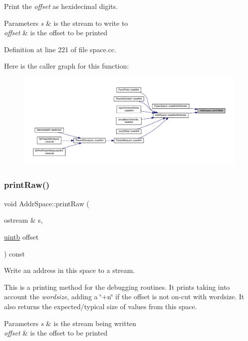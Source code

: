 Print the {\itshape offset} as hexidecimal digits. 
\begin{DoxyParams}{Parameters}
{\em s} & is the stream to write to \\
\hline
{\em offset} & is the offset to be printed \\
\hline
\end{DoxyParams}


Definition at line 221 of file space.\+cc.

Here is the caller graph for this function\+:
\nopagebreak
\begin{figure}[H]
\begin{center}
\leavevmode
\includegraphics[width=350pt]{class_addr_space_aac551de6286f9260153c1d7d1bacdab8_icgraph}
\end{center}
\end{figure}
\mbox{\label{class_addr_space_a76819b70cd6b6ae8601ac1821f86b929}} 
\subsubsection{\texorpdfstring{printRaw()}{printRaw()}}
{\footnotesize\ttfamily void Addr\+Space\+::print\+Raw (\begin{DoxyParamCaption}\item[{ostream \&}]{s,  }\item[{\mbox{\hyperlink{types_8h_a2db313c5d32a12b01d26ac9b3bca178f}{uintb}}}]{offset }\end{DoxyParamCaption}) const\hspace{0.3cm}{\ttfamily [virtual]}}



Write an address in this space to a stream. 

This is a printing method for the debugging routines. It prints taking into account the {\itshape wordsize}, adding a \char`\"{}+n\char`\"{} if the offset is not on-\/cut with wordsize. It also returns the expected/typical size of values from this space. 
\begin{DoxyParams}{Parameters}
{\em s} & is the stream being written \\
\hline
{\em offset} & is the offset to be printed \\
\hline
\end{DoxyParams}


